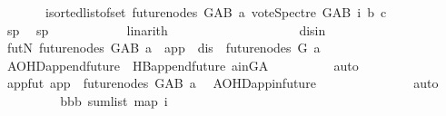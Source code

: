 \begin{isabellebody}
\ \ \ \ \ \ {\isasymle}\ {\isacharparenleft}{\kern0pt}{\isasymSum}i{\isasymleftarrow}sorted{\isacharunderscore}{\kern0pt}list{\isacharunderscore}{\kern0pt}of{\isacharunderscore}{\kern0pt}set\ {\isacharparenleft}{\kern0pt}future{\isacharunderscore}{\kern0pt}nodes\ G{\isacharunderscore}{\kern0pt}AB\ a{\isacharparenright}{\kern0pt}{\isachardot}{\kern0pt}\ vote{\isacharunderscore}{\kern0pt}Spectre\ G{\isacharunderscore}{\kern0pt}AB\ i\ b\ c{\isacharparenright}{\kern0pt}{\isachardoublequoteclose}\isanewline
\ \ \ \ \ \ \ \ \ \ \isamarkupfalse%
\ sp{}\ \isamarkupfalse%
\ sp{}\isanewline
\ \ \ \ \ \ \ \ \ \ \isamarkupfalse%
\ linarith\ \isanewline
\ \ \ \ \ \ \isamarkupfalse%
\isanewline
\ \ \ \ \isamarkupfalse%
\isanewline
\ \ \ \ \ \ \isamarkupfalse%
\ disin\isanewline
\ \ \ \ \ \ \isamarkupfalse%
\ futN{\isacharcolon}{\kern0pt}\ {\isachardoublequoteopen}future{\isacharunderscore}{\kern0pt}nodes\ G{\isacharunderscore}{\kern0pt}AB\ a\ {\isacharminus}{\kern0pt}\ {\isacharbraceleft}{\kern0pt}app{\isacharbraceright}{\kern0pt}\ {\isacharminus}{\kern0pt}\ {\isacharbraceleft}{\kern0pt}dis{\isacharbraceright}{\kern0pt}\ {\isacharequal}{\kern0pt}\ future{\isacharunderscore}{\kern0pt}nodes\ G\ a{\isachardoublequoteclose}\isanewline
\ \ \ \ \ \ \ \ \isamarkupfalse%
\ AOHD{\isachardot}{\kern0pt}append{\isacharunderscore}{\kern0pt}future\ {}{\isacharparenleft}{\kern0pt}{}{\isacharparenright}{\kern0pt}\ HB{}{\isachardot}{\kern0pt}append{\isacharunderscore}{\kern0pt}future\ a{\isacharunderscore}{\kern0pt}in{\isacharunderscore}{\kern0pt}G{\isacharunderscore}{\kern0pt}A\isanewline
\ \ \ \ \ \ \ \ \isamarkupfalse%
\ auto\isanewline
\ \ \ \ \ \ \isamarkupfalse%
\ \isamarkupfalse%
\ appfut{\isacharcolon}{\kern0pt}\ {\isachardoublequoteopen}app\ {\isasymin}\ future{\isacharunderscore}{\kern0pt}nodes\ G{\isacharunderscore}{\kern0pt}AB\ a{\isachardoublequoteclose}\ \isamarkupfalse%
\ AOHD{\isachardot}{\kern0pt}app{\isacharunderscore}{\kern0pt}in{\isacharunderscore}{\kern0pt}future{}\ \ \isanewline
\ \ \ \ \ \ \ \ \ \ {}{\isacharparenleft}{\kern0pt}{}{\isacharparenright}{\kern0pt}\ \isamarkupfalse%
\ auto\isanewline
\ \ \ \ \ \ \isamarkupfalse%
\ \isamarkupfalse%
\ bbb{\isacharcolon}{\kern0pt}\ {\isachardoublequoteopen}sum{\isacharunderscore}{\kern0pt}list\ {\isacharparenleft}{\kern0pt}map\ {\isacharparenleft}{\kern0pt}{\isasymlambda}i{\isachardot}{\kern0pt}\isanewline

\end{isabellebody}
